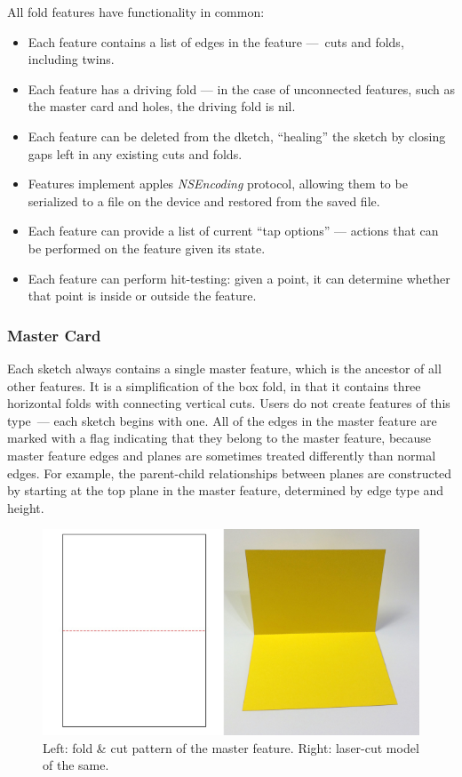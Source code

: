 All fold features have functionality in common:

\begin{itemize}
\itemsep1pt\parskip0pt
\item
  Each feature contains a list of edges in the feature ---~cuts and
  folds, including twins.
\item
  Each feature has a driving fold --- in the case of unconnected
  features, such as the master card and holes, the driving fold is nil.
\item
  Each feature can be deleted from the dketch, ``healing'' the sketch by
  closing gaps left in any existing cuts and folds.
\item
  Features implement apples \emph{NSEncoding} protocol, allowing them to
  be serialized to a file on the device and restored from the saved
  file.
\item
  Each feature can provide a list of current ``tap options'' --- actions
  that can be performed on the feature given its state.
\item
  Each feature can perform hit-testing: given a point, it can determine
  whether that point is inside or outside the feature.
\end{itemize}

\subsubsection{Master Card}\label{master-card}

Each sketch always contains a single master feature, which is the
ancestor of all other features. It is a simplification of the box fold,
in that it contains three horizontal folds with connecting vertical
cuts. Users do not create features of this type~--- each sketch begins
with one. All of the edges in the master feature are marked with a flag
indicating that they belong to the master feature, because master
feature edges and planes are sometimes treated differently than normal
edges. For example, the parent-child relationships between planes are
constructed by starting at the top plane in the master feature,
determined by edge type and height.

\begin{figure}[htbp]
\centering
\includegraphics{figures/33_UI_Interface_Data_Structures/mastercard.pdf}
\caption{Left: fold \& cut pattern of the master feature. Right:
laser-cut model of the same.}
\end{figure}

